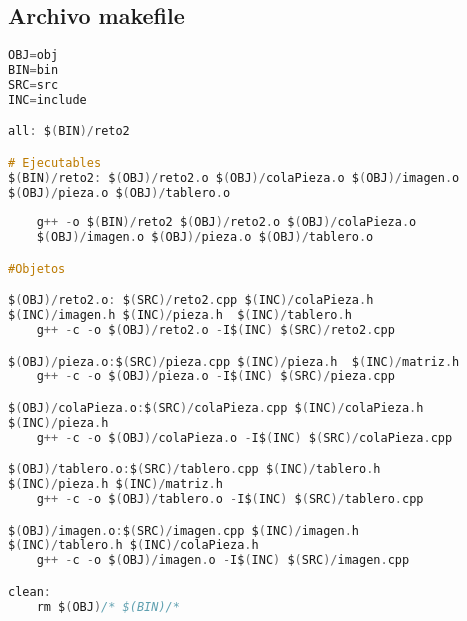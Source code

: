 \documentclass[12pt, spanish]{article}
\begin{document}
\pagebreak


\subsection{Archivo makefile }
\begin{lstlisting}[language=C]
OBJ=obj
BIN=bin
SRC=src
INC=include

all: $(BIN)/reto2

# Ejecutables
$(BIN)/reto2: $(OBJ)/reto2.o $(OBJ)/colaPieza.o $(OBJ)/imagen.o 
$(OBJ)/pieza.o $(OBJ)/tablero.o
	
	g++ -o $(BIN)/reto2 $(OBJ)/reto2.o $(OBJ)/colaPieza.o 
	$(OBJ)/imagen.o $(OBJ)/pieza.o $(OBJ)/tablero.o

#Objetos

$(OBJ)/reto2.o: $(SRC)/reto2.cpp $(INC)/colaPieza.h 
$(INC)/imagen.h	$(INC)/pieza.h	$(INC)/tablero.h
	g++ -c -o $(OBJ)/reto2.o -I$(INC) $(SRC)/reto2.cpp

$(OBJ)/pieza.o:$(SRC)/pieza.cpp $(INC)/pieza.h	$(INC)/matriz.h
	g++ -c -o $(OBJ)/pieza.o -I$(INC) $(SRC)/pieza.cpp

$(OBJ)/colaPieza.o:$(SRC)/colaPieza.cpp $(INC)/colaPieza.h	
$(INC)/pieza.h
	g++ -c -o $(OBJ)/colaPieza.o -I$(INC) $(SRC)/colaPieza.cpp

$(OBJ)/tablero.o:$(SRC)/tablero.cpp $(INC)/tablero.h 
$(INC)/pieza.h $(INC)/matriz.h
	g++ -c -o $(OBJ)/tablero.o -I$(INC) $(SRC)/tablero.cpp

$(OBJ)/imagen.o:$(SRC)/imagen.cpp $(INC)/imagen.h 
$(INC)/tablero.h $(INC)/colaPieza.h
	g++ -c -o $(OBJ)/imagen.o -I$(INC) $(SRC)/imagen.cpp

clean:
	rm $(OBJ)/* $(BIN)/*

\end{lstlisting}
\end{document}
